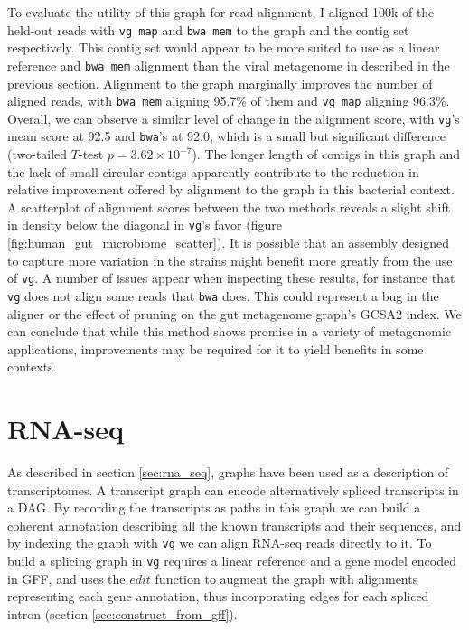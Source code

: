 \documentclass[a4paper,12pt,numbered,oneside]{Classes/PhDThesisPSnPDF}
\begin{document}
To evaluate the utility of this graph for read alignment, I aligned 100k of the held-out reads with {\tt vg map} and {\tt bwa mem} to the graph and the contig set respectively.
This contig set would appear to be more suited to use as a linear reference and {\tt bwa mem} alignment than the viral metagenome in described in the previous section.
Alignment to the graph marginally improves the number of aligned reads, with {\tt bwa mem} aligning 95.7\% of them and {\tt vg map} aligning 96.3\%.
Overall, we can observe a similar level of change in the alignment score, with {\tt vg}'s mean score at 92.5 and {\tt bwa}'s at 92.0, which is a small but significant difference (two-tailed $T$-test $p=3.62\times 10^{-7}$).
The longer length of contigs in this graph and the lack of small circular contigs apparently contribute to the reduction in relative improvement offered by alignment to the graph in this bacterial context.
A scatterplot of alignment scores between the two methods reveals a slight shift in density below the diagonal in {\tt vg}'s favor (figure \ref{fig:human_gut_microbiome_scatter}).
It is possible that an assembly designed to capture more variation in the strains might benefit more greatly from the use of {\tt vg}.
A number of issues appear when inspecting these results, for instance that {\tt vg} does not align some reads that {\tt bwa} does.
This could represent a bug in the aligner or the effect of pruning on the gut metagenome graph's GCSA2 index.
We can conclude that while this method shows promise in a variety of metagenomic applications, improvements may be required for it to yield benefits in some contexts.


\section{RNA-seq}

As described in section \ref{sec:rna_seq}, graphs have been used as a description of transcriptomes.
A transcript graph can encode alternatively spliced transcripts in a DAG.
By recording the transcripts as paths in this graph we can build a coherent annotation describing all the known transcripts and their sequences, and by indexing the graph with {\tt vg} we can align RNA-seq reads directly to it.
To build a splicing graph in {\tt vg} requires a linear reference and a gene model encoded in GFF, and uses the $edit$ function to augment the graph with alignments representing each gene annotation, thus incorporating edges for each spliced intron (section \ref{sec:construct_from_gff}).
\end{document}
